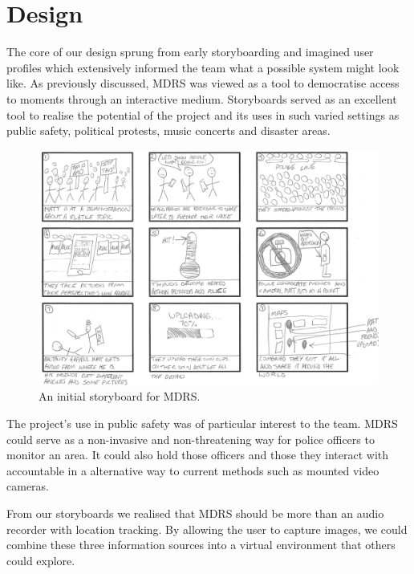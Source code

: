 \documentclass{l3proj}
\begin{document}
\chapter{Design}
\label{design}

The core of our design sprung from early storyboarding and imagined user profiles which extensively informed the team what a possible system might look like. As previously discussed, MDRS was viewed as a tool to democratise access to moments through an interactive medium. Storyboards served as an excellent tool to realise the potential of the project and its uses in such varied settings as public safety, political protests, music concerts and disaster areas.

\begin{figure}[ht!]
\centering
\includegraphics[width=1\textwidth]{images/ally-storyboard.jpg}
\caption{An initial storyboard for MDRS.}
\end{figure}

The project's use in public safety was of particular interest to the team. MDRS could serve as a non-invasive and non-threatening way for police officers to monitor an area. It could also hold those officers and those they interact with accountable in a alternative way to current methods such as mounted video cameras.

From our storyboards we realised that MDRS should be more than an audio recorder with location tracking. By allowing the user to capture images, we could combine these three information sources into a virtual environment that others could explore.
\end{document}

